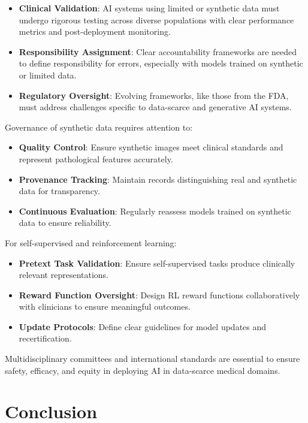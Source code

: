 \documentclass{article}
\begin{document}
\begin{itemize}
    \item \textbf{Clinical Validation}: AI systems using limited or synthetic data must undergo rigorous testing across diverse populations with clear performance metrics and post-deployment monitoring.
    \item \textbf{Responsibility Assignment}: Clear accountability frameworks are needed to define responsibility for errors, especially with models trained on synthetic or limited data.
    \item \textbf{Regulatory Oversight}: Evolving frameworks, like those from the FDA, must address challenges specific to data-scarce and generative AI systems.
\end{itemize}

Governance of synthetic data requires attention to:

\begin{itemize}
    \item \textbf{Quality Control}: Ensure synthetic images meet clinical standards and represent pathological features accurately.
    \item \textbf{Provenance Tracking}: Maintain records distinguishing real and synthetic data for transparency.
    \item \textbf{Continuous Evaluation}: Regularly reassess models trained on synthetic data to ensure reliability.
\end{itemize}

For self-supervised and reinforcement learning:

\begin{itemize}
    \item \textbf{Pretext Task Validation}: Ensure self-supervised tasks produce clinically relevant representations.
    \item \textbf{Reward Function Oversight}: Design RL reward functions collaboratively with clinicians to ensure meaningful outcomes.
    \item \textbf{Update Protocols}: Define clear guidelines for model updates and recertification.
\end{itemize}

Multidisciplinary committees and international standards are essential to ensure safety, efficacy, and equity in deploying AI in data-scarce medical domains.

\section{Conclusion}
\label{sec:conc}
\end{document}
